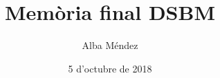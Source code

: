 \documentclass[catalan,parskip=half*,oneside,DIV=11,hidelinks]{scrreprt}
\let\myTOC\tableofcontents
\renewcommand\tableofcontents{%
  \pdfbookmark[1]{\contentsname}{}
  \myTOC }
\begin{document}
\title{Memòria final DSBM}
\date{5 d'octubre de 2018}
\author{Alba Méndez}

\maketitle

\tableofcontents
\clearpage


\newcommand{\projectname}{}
\newcommand{\inputproject}[1]{
  \dumpaccum
  \renewcommand{\projectname}{#1}
  
}
\end{document}
